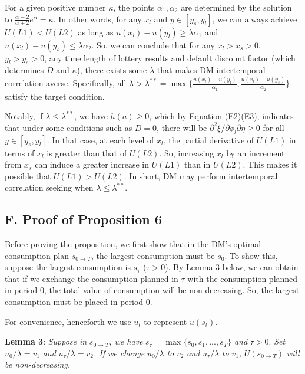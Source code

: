 \documentclass[
  12pt,
]{article}
\begin{document}
For a given positive number \(\kappa\), the points \(\alpha_1,\alpha_2\)
are determined by the solution to
\(\frac{\alpha-2}{\alpha+2}e^{\alpha}=\kappa\). In other words, for any
\(x_l\) and \(y\in[y_s,y_l]\), we can always achieve \(U(L1)<U(L2)\) as
long as \(u(x_l)-u(y_l)\geq \lambda\alpha_1\) and
\(u(x_l)-u(y_s)\leq\lambda\alpha_2\). So, we can conclude that for any
\(x_l>x_s>0\), \(y_l>y_s>0\), any time length of lottery results and
default discount factor (which determines \(D\) and \(\kappa\)), there
exists some \(\lambda\) that makes DM intertemporal correlation averse.
Specifically, all
\(\lambda>\lambda^{**} ={\max}\{\frac{u(x_l)-u(y_l)}{\alpha_1},\frac{u(x_l)-u(y_s)}{\alpha_2}\}\)
satisfy the target condition.

Notably, if \(\lambda\leq\lambda^{**}\), we have \(h(a)\geq0\), which by
Equation (E2)(E3), indicates that under some conditions such as \(D=0\),
there will be \(\partial^2 \xi/\partial \phi_l\partial \eta\geq0\) for
all \(y\in[y_s,y_l]\). In that case, at each level of \(x_l\), the
partial derivative of \(U(L1)\) in terms of \(x_l\) is greater than that
of \(U(L2)\). So, increasing \(x_l\) by an increment from \(x_s\) can
induce a greater increase in \(U(L1)\) than in \(U(L2)\). This makes it
possible that \(U(L1)>U(L2)\). In short, DM may perform intertemporal
correlation seeking when \(\lambda\leq\lambda^{**}\).

\hypertarget{f.-proof-of-proposition-6}{%
\subsection*{F. Proof of Proposition
6}\label{f.-proof-of-proposition-6}}

Before proving the proposition, we first show that in the DM's optimal
consumption plan \(s_{0\rightarrow T}\), the largest consumption must be
\(s_0\). To show this, suppose the largest consumption is \(s_\tau\)
(\(\tau>0\)). By Lemma 3 below, we can obtain that if we exchange the
consumption planned in \(\tau\) with the consumption planned in period
0, the total value of consumption will be non-decreasing. So, the
largest consumption must be placed in period 0.

For convenience, henceforth we use \(u_t\) to represent \(u(s_t)\).

\noindent \textbf{Lemma 3}: \emph{Suppose in}
\(s_{0\rightarrow T}\)\emph{, we have}
\(s_\tau= \max\{s_0,s_1,...,s_T\}\) \emph{and} \(\tau>0\). \emph{Set}
\(u_0/\lambda=v_1\) \emph{and} \(u_{\tau}/\lambda=v_2\)\emph{. If we
change} \(u_0/\lambda\) \emph{to} \(v_2\) \emph{and}
\(u_{\tau}/\lambda\) \emph{to} \(v_1\)\emph{,} \(U(s_{0\rightarrow T})\)
\emph{will be non-decreasing.}
\end{document}
